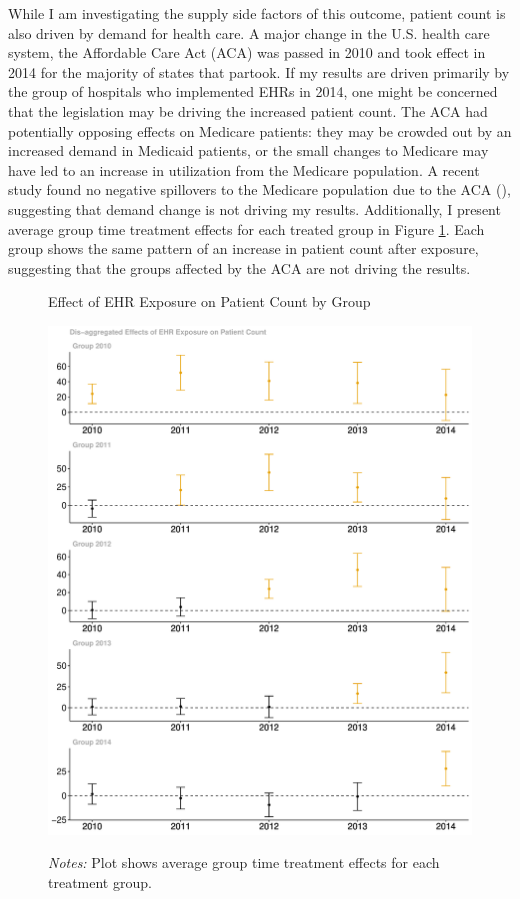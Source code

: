 \documentclass[12pt]{article}
\begin{document}
While I am investigating the supply side factors of this outcome, patient count is also driven by demand for health care. A major change in the U.S. health care system, the Affordable Care Act (ACA) was passed in 2010 and took effect in 2014 for the majority of states that partook. If my results are driven primarily by the group of hospitals who implemented EHRs in 2014, one might be concerned that the legislation may be driving the increased patient count. The ACA had potentially opposing effects on Medicare patients: they may be crowded out by an increased demand in Medicaid patients, or the small changes to Medicare may have led to an increase in utilization from the Medicare population. A recent study found no negative spillovers to the Medicare population due to the ACA (\cite{carey2020impact}), suggesting that demand change is not driving my results. Additionally, I present average group time treatment effects for each treated group in Figure \ref{fig:patientgroup}. Each group shows the same pattern of an increase in patient count after exposure, suggesting that the groups affected by the ACA are not driving the results. 

\begin{figure}[ht!]
    \centering
    \captionsetup{width=.6\linewidth}
    \caption{Effect of EHR Exposure on Patient Count by Group}
    \includegraphics[scale=.47]{Objects/patient_group.pdf}
    \label{fig:patientgroup}
    \vspace{2mm}
    \caption*{\footnotesize{\textit{Notes:} Plot shows average group time treatment effects for each treatment group.}}
\end{figure}
\end{document}
